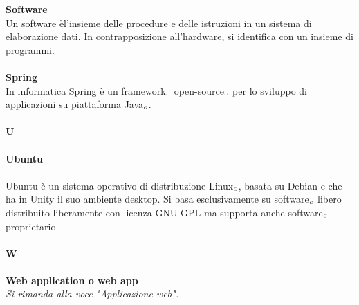 \textbf{Software} \\
Un software èl'insieme delle procedure e delle istruzioni in un sistema di elaborazione dati. In contrapposizione all'hardware, si identifica con un insieme di programmi. \\
\\
\textbf{Spring} \\
In informatica Spring è un framework$_{\scaleto{G}{3pt}}$ open-source$_{\scaleto{G}{3pt}}$ per lo sviluppo di applicazioni su piattaforma Java$_{\scaleto{G}{3pt}}$.\\
\\
\textbf{U} \\
\\
\textbf{Ubuntu} \\
\\
Ubuntu è un sistema operativo di distribuzione Linux$_{\scaleto{G}{3pt}}$, basata su Debian e che ha in Unity il suo ambiente desktop. Si basa esclusivamente su software$_{\scaleto{G}{3pt}}$ libero distribuito liberamente con licenza GNU GPL ma supporta anche software$_{\scaleto{G}{3pt}}$ proprietario. \\
\\
\textbf{W} \\
\\
\textbf{Web application o web app}\\
\textit{Si rimanda alla voce "Applicazione web".}